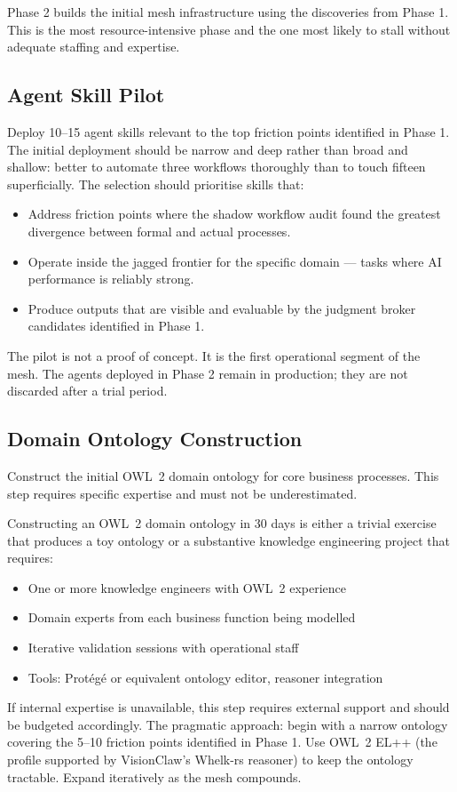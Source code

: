 Phase 2 builds the initial mesh infrastructure using the discoveries from Phase 1. This is the most resource-intensive phase and the one most likely to stall without adequate staffing and expertise.

\subsection{Agent Skill Pilot}

Deploy 10--15 agent skills relevant to the top friction points identified in Phase 1. The initial deployment should be narrow and deep rather than broad and shallow: better to automate three workflows thoroughly than to touch fifteen superficially. The selection should prioritise skills that:

\begin{itemize}
  \item Address friction points where the shadow workflow audit found the greatest divergence between formal and actual processes.
  \item Operate inside the jagged frontier for the specific domain --- tasks where AI performance is reliably strong.
  \item Produce outputs that are visible and evaluable by the judgment broker candidates identified in Phase 1.
\end{itemize}

The pilot is not a proof of concept. It is the first operational segment of the mesh. The agents deployed in Phase 2 remain in production; they are not discarded after a trial period.

\subsection{Domain Ontology Construction}

Construct the initial OWL~2 domain ontology for core business processes. This step requires specific expertise and must not be underestimated.

\begin{cautionbox}[title={Ontology Construction Is Not a Side Project}]
Constructing an OWL~2 domain ontology in 30 days is either a trivial exercise that produces a toy ontology or a substantive knowledge engineering project that requires:
\begin{itemize}
  \item One or more knowledge engineers with OWL~2 experience
  \item Domain experts from each business function being modelled
  \item Iterative validation sessions with operational staff
  \item Tools: Prot\'{e}g\'{e} or equivalent ontology editor, reasoner integration
\end{itemize}
If internal expertise is unavailable, this step requires external support and should be budgeted accordingly. The pragmatic approach: begin with a narrow ontology covering the 5--10 friction points identified in Phase 1. Use OWL~2 EL++ (the profile supported by VisionClaw's Whelk-rs reasoner) to keep the ontology tractable. Expand iteratively as the mesh compounds.
\end{cautionbox}

